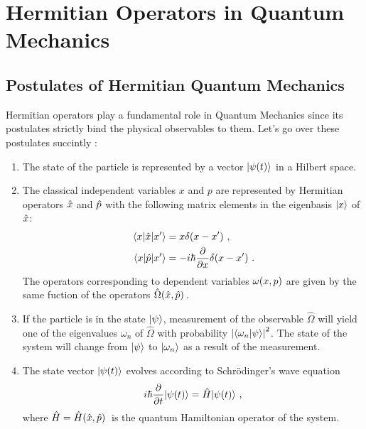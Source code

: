 \chapter{Hermitian Operators in Quantum Mechanics}\label{ch:hermiticity}
    \section{Postulates of Hermitian Quantum Mechanics}
        Hermitian operators play a fundamental role in Quantum Mechanics since its postulates strictly bind the physical observables to them. Let's go over these postulates succintly \cite{Shankar2012-kg}:
        \begin{enumerate}[label=\Roman*.]
            \item The state of the particle is represented by a vector $\ket{\psi\pqty{t}}$ in a Hilbert space.
            \item The classical independent variables $x$ and $p$ are represented by Hermitian operators $\hat{x}$ and $\hat{p}$ with the following matrix elements in the eigenbasis $\ket{x}$ of $\hat{x}$:
            \begin{align*}
                \mel*{x}{\hx}{x'} &= x\delta\pqty*{x-x'} \mycomma \\
                \mel*{x}{\hp}{x'} &= -i\hbar\pdv{x}\delta\pqty*{x-x'} \myperiod
            \end{align*}
            The operators corresponding to dependent variables $\omega\pqty{x,p}$ are given by the same fuction of the operators $\hat{\Omega}\pqty*{\hx,\hp}$.
            \item If the particle is in the state $\ket{\psi}$, measurement of the observable $\hat{\Omega}$ will yield one of the eigenvalues $\omega_n$ of $\hat{\Omega}$ with probability $\abs{\braket{\omega_n}{\psi}}^2$. The state of the system will change from $\ket{\psi}$ to $\ket{\omega_n}$ as a result of the measurement.
            \item The state vector $\ket{\psi\pqty{t}}$ evolves according to Schr\"odinger's wave equation
            \begin{equation}
                i\hbar\pdv{t}\!\ket{\psi\pqty{t}} = \hH\!\ket{\psi\pqty{t}}
                \mycomma
                \label{eq:schrodinger}
            \end{equation}
            where $\hH = \hH\pqty*{\hx,\hp}$ is the quantum Hamiltonian operator of the system.
        \end{enumerate}

